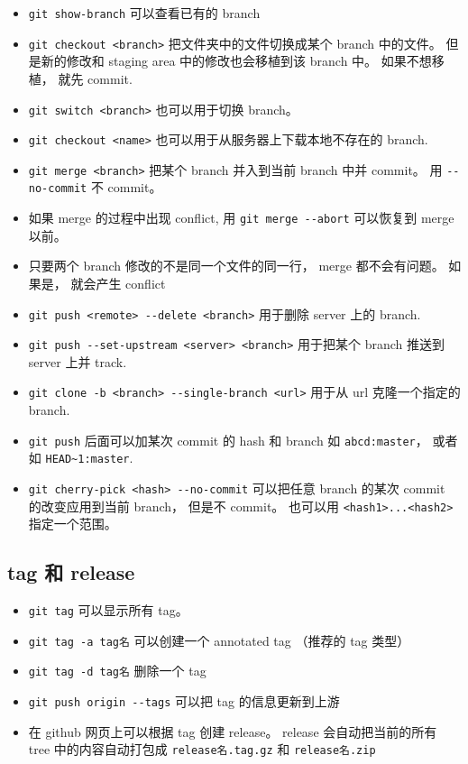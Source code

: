 \begin{itemize}
\item \verb|git show-branch| 可以查看已有的 branch 
\item \verb|git checkout <branch>| 把文件夹中的文件切换成某个 branch 中的文件。 但是新的修改和 staging area 中的修改也会移植到该 branch 中。 如果不想移植， 就先 commit.
\item \verb|git switch <branch>| 也可以用于切换 branch。
\item \verb|git checkout <name>| 也可以用于从服务器上下载本地不存在的 branch.
\item \verb|git merge <branch>| 把某个 branch 并入到当前 branch 中并 commit。 用 \verb|--no-commit| 不 commit。
\item 如果 merge 的过程中出现 conflict, 用 \verb|git merge --abort| 可以恢复到 merge 以前。
\item 只要两个 branch 修改的不是同一个文件的同一行， merge 都不会有问题。 如果是， 就会产生 conflict



\item \verb|git push <remote> --delete <branch>| 用于删除 server 上的 branch.
\item \verb|git push --set-upstream <server> <branch>| 用于把某个 branch 推送到 server 上并 track.


\item \verb|git clone -b <branch> --single-branch <url>| 用于从 url 克隆一个指定的 branch.
\item \verb|git push| 后面可以加某次 commit 的 hash 和 branch 如 \verb|abcd:master|， 或者如 \verb|HEAD~1:master|.

\item \verb|git cherry-pick <hash> --no-commit| 可以把任意 branch 的某次 commit 的改变应用到当前 branch， 但是不 commit。 也可以用 \verb|<hash1>...<hash2>| 指定一个范围。
\end{itemize}

\subsection{tag 和 release}
\begin{itemize}
\item \verb|git tag| 可以显示所有 tag。
\item \verb|git tag -a tag名| 可以创建一个 annotated tag （推荐的 tag 类型）
\item \verb|git tag -d tag名| 删除一个 tag
\item \verb|git push origin --tags| 可以把 tag 的信息更新到上游
\item 在 github 网页上可以根据 tag 创建 release。 release 会自动把当前的所有 tree 中的内容自动打包成 \verb|release名.tag.gz| 和 \verb|release名.zip|
\end{itemize}

